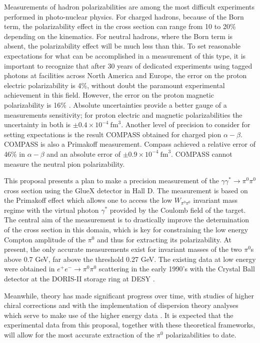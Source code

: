Measurements of hadron polarizabilities are among the most difficult
experiments performed in photo-nuclear physics. For charged hadrons,
because of the Born term, the polarizability effect in the cross
section can range from 10 to 20\% depending on the kinematics.  For
neutral hadrons, where the Born term is absent, the polarizability
effect will be much less than this.  To set reasonable expectations
for what can be accomplished in a measurement of this type, it is
important to recognize that after 30 years of dedicated experiments
using tagged photons at facilities across North America and Europe,
the error on the proton electric polarizability is 4\%, without doubt
the paramount experimental achievement in this field. However, the
error on the proton magnetic polarizability is 16\%
\cite{PDGTanabashi:2018oca}.  Absolute uncertainties provide a better
gauge of a measurements sensitivity; for proton electric and magnetic
polarizabilities the uncertainty in both is $\pm 0.4 \times
10^{-4}~\mathrm{fm}^3$.  Another level of precision to consider for
setting expectations is the result COMPASS obtained for charged pion
$\alpha - \beta$. COMPASS is also a Primakoff measurement. Compass
achieved a relative error of 46\% in $\alpha - \beta$ and an absolute
error of $\pm 0.9 \times 10^{-4}~\mathrm{fm}^3$.  COMPASS cannot
measure the neutral pion polarizability.



This proposal presents a plan to make a precision measurement of the
$\gamma \gamma^* \rightarrow \pi^0 \pi^0$ cross section using the
GlueX detector in Hall D.  The measurement is based on the Primakoff
effect which allows one to access the low $W_{\pi^0\pi^0}$ invariant
mass regime with the virtual photon $\gamma^*$ provided by the
Coulomb field of the target. The central aim of the measurement is to
drastically improve the determination of the cross section in this
domain, which is key for constraining the low energy Compton amplitude
of the $\pi^0$ and thus for extracting its polarizability.  At
present, the only accurate measurements exist for invariant masses of
the two $\pi^0$s above 0.7 GeV, far above the threshold 0.27 GeV. The
existing data at low energy were obtained in $e^+ e^- \to \pi^0\pi^0 $
scattering in the early 1990's with the Crystal Ball detector at the
DORIS-II storage ring at DESY \cite{Marsiske:1990hx}.

Meanwhile, theory has made significant progress over time, with
studies of higher chiral corrections 
\cite{Bellucci:1994eb,Gasser:2005ud,Aleksejevs:2014eea} and with the
implementation of dispersion theory analyses which serve to make use
of the higher energy data
\cite{Oller:2008kf,Dai:2014zta,Dai:2014lza,Moussallam:2013una}. It is
expected that the experimental data from this proposal, together with
these theoretical frameworks, will allow for the most accurate
extraction of the $\pi^0$ polarizabilities to date.
